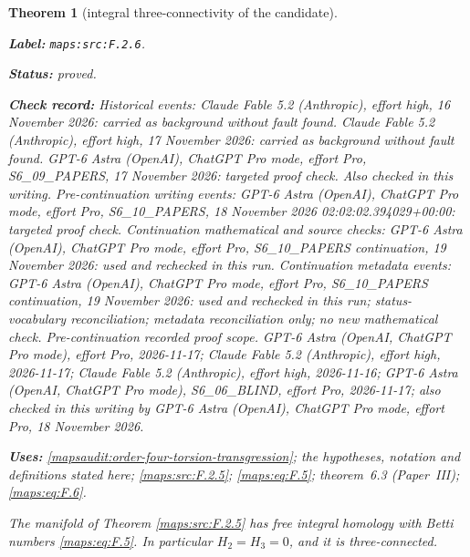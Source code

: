 \documentclass[11pt,a4paper]{article}
\newtheorem{theorem}{Theorem}[section]
\theoremstyle{definition}
\newcommand{\StatementRecord}[4]{\par\smallskip\begingroup\upshape\raggedright\noindent\textbf{Label:} \nolinkurl{#1}.\par\noindent\textbf{Status:} #2.\par\noindent\textbf{Check record:} #3.\par\noindent\textbf{Uses:} #4.\par\endgroup\smallskip}
\newcommand{\ExternalPaperRef}[3]{\ifmmode\text{\upshape #1#2 (Paper~#3)}\else #1#2 (Paper~#3)\fi}
\begin{document}
\begin{theorem}[integral three-connectivity of the candidate]\label{maps:src:F.2.6}
\StatementRecord{maps:src:F.2.6}{proved}{Historical events: Claude Fable 5.2 (Anthropic), effort high, 16 November 2026: carried as background without fault found. Claude Fable 5.2 (Anthropic), effort high, 17 November 2026: carried as background without fault found. GPT-6 Astra (OpenAI), ChatGPT Pro mode, effort Pro, S6\_09\_PAPERS, 17 November 2026: targeted proof check. Also checked in this writing. Pre-continuation writing events: GPT-6 Astra (OpenAI), ChatGPT Pro mode, effort Pro, S6\_10\_PAPERS, 18 November 2026 02:02:02.394029+00:00: targeted proof check. Continuation mathematical and source checks: GPT-6 Astra (OpenAI), ChatGPT Pro mode, effort Pro, S6\_10\_PAPERS continuation, 19 November 2026: used and rechecked in this run. Continuation metadata events: GPT-6 Astra (OpenAI), ChatGPT Pro mode, effort Pro, S6\_10\_PAPERS continuation, 19 November 2026: used and rechecked in this run; status-vocabulary reconciliation; metadata reconciliation only; no new mathematical check. \emph{Pre-continuation recorded proof scope.} GPT-6 Astra (OpenAI, ChatGPT Pro mode), effort Pro, 2026-11-17; Claude Fable 5.2 (Anthropic), effort high, 2026-11-17; Claude Fable 5.2 (Anthropic), effort high, 2026-11-16; GPT-6 Astra (OpenAI, ChatGPT Pro mode), S6\_06\_BLIND, effort Pro, 2026-11-17; also checked in this writing by GPT-6 Astra (OpenAI), ChatGPT Pro mode, effort Pro, 18 November 2026}{\cref{mapsaudit:order-four-torsion-transgression}; the hypotheses, notation and definitions stated here; \cref{maps:src:F.2.5}; \cref{maps:eq:F.5}; \ExternalPaperRef{theorem~}{6.3}{III}; \cref{maps:eq:F.6}}


The manifold of Theorem \ref{maps:src:F.2.5} has free integral homology with
Betti numbers \eqref{maps:eq:F.5}.  In particular $H_2=H_3=0$, and it is
three-connected.

\end{theorem}
\end{document}
